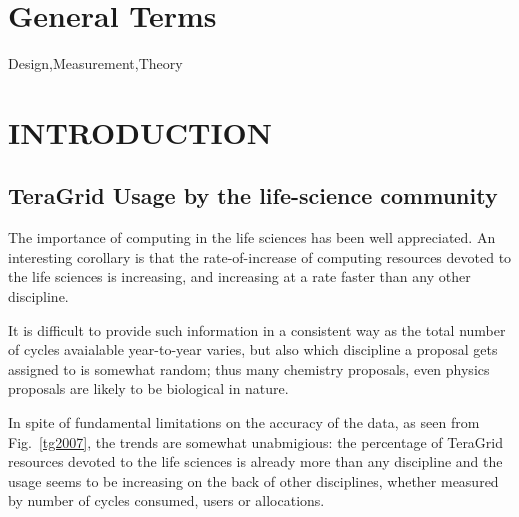 \documentclass{sig-alternate}
\begin{document}

\section*{General Terms}{Design,Measurement,Theory}






\section{INTRODUCTION}

\subsection{TeraGrid Usage by the life-science community}

The importance of computing in the life sciences has been well
appreciated. An interesting corollary is that the rate-of-increase of
computing resources devoted to the life sciences is increasing, and
increasing at a rate faster than any other discipline. 

It is difficult to provide such information in a consistent way
as the total number of cycles avaialable year-to-year varies, but
also which discipline a proposal gets assigned to is somewhat
random; thus many chemistry proposals, even physics proposals
are likely to be biological in nature. 

In spite of fundamental limitations on the accuracy of the data,
as seen from Fig.~\ref{tg2007}, the trends are somewhat
unabmigious: the percentage of TeraGrid resources devoted
to the life sciences is already more than any discipline and
the usage seems to be increasing on the back of other disciplines, 
whether measured by number of cycles consumed, users or 
allocations.
\end{document}
